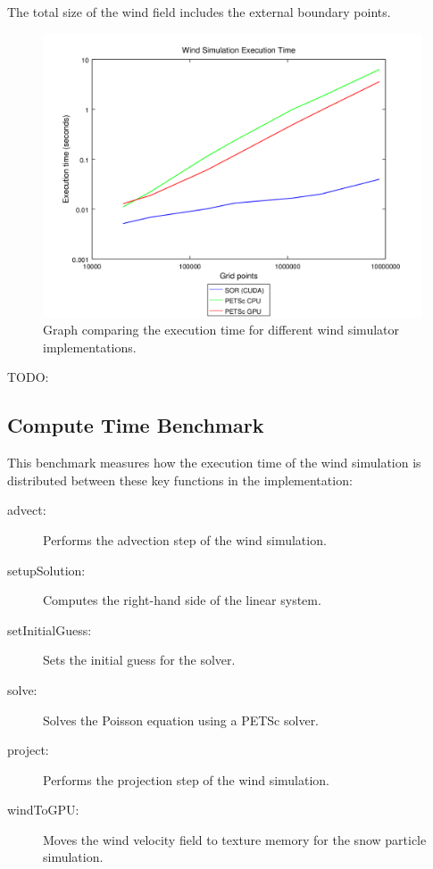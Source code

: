 The total size of the wind field includes the external boundary points.

\begin{figure}[ht]
	\center
	\includegraphics[width=1.0\textwidth]{results/data/wb/exec_time_all}
	\caption{Graph comparing the execution time for different wind simulator
		implementations.}
	\label{fig:wind_sim_time}
\end{figure}

TODO: 

\subsection{Compute Time Benchmark}

This benchmark measures how the execution time of the wind simulation is distributed
between these key functions in the implementation:
\begin{description}
	\item[advect:] Performs the advection step of the wind simulation.
	\item[setupSolution:] Computes the right-hand side of the linear system.
	\item[setInitialGuess:] Sets the initial guess for the solver.
	\item[solve:] Solves the Poisson equation using a PETSc solver.
	\item[project:] Performs the projection step of the wind simulation.
	\item[windToGPU:] Moves the wind velocity field to texture memory for the
	snow particle simulation.
\end{description}

